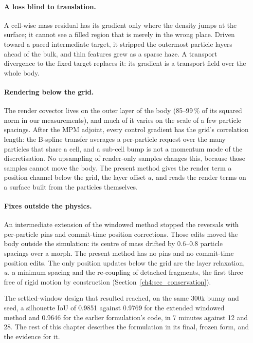 \paragraph{A loss blind to translation.} A cell-wise mass residual has its gradient only where the density jumps at
the surface; it cannot see a filled region that is merely in the wrong place. Driven toward a paced intermediate
target, it stripped the outermost particle layers ahead of the bulk, and thin features grew as a sparse haze. A
transport divergence to the fixed target replaces it: its gradient is a transport field over the whole body.

\paragraph{Rendering below the grid.} The render covector lives on the outer layer of the body (85--99\,\% of its
squared norm in our measurements), and much of it varies on the scale of a few particle spacings. After the MPM adjoint, every control
gradient has the grid's correlation length: the B-spline transfer averages a per-particle request over the
many particles that share a cell, and a sub-cell bump is not a momentum mode of the discretisation. No
upsampling of render-only samples changes this, because those samples cannot move the body. The present method
gives the render term a position channel below the grid, the layer offset $u$, and reads the render terms on a
surface built from the particles themselves.

\paragraph{Fixes outside the physics.} An intermediate extension of the windowed method stopped the reversals with
per-particle pins and commit-time position corrections. Those edits moved the body outside the simulation: its
centre of mass drifted by 0.6--0.8 particle spacings over a morph. The present method has no pins and no
commit-time position edits. The only position updates below the grid are the layer relaxation, $u$, a minimum
spacing and the re-coupling of detached fragments, the first three free of rigid motion by construction
(Section~\ref{ch4:sec_conservation}).

The settled-window design that resulted reached, on the same 300k bunny and seed, a silhouette IoU of 0.9851
against 0.9769 for the extended windowed method and 0.9646 for the earlier formulation's code, in 7 minutes
against 12 and 28. The rest of this chapter describes the formulation in its final, frozen form, and the evidence
for it.


